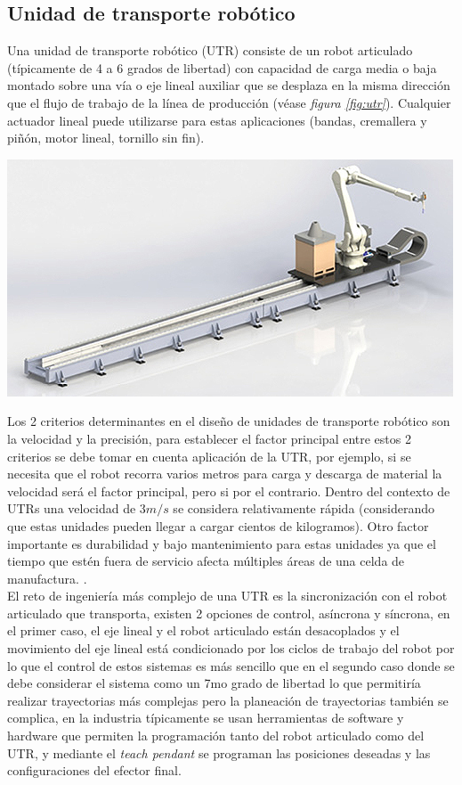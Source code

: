 \subsection{Unidad de transporte robótico}
Una unidad de transporte robótico (UTR) consiste de un robot articulado (típicamente de 4 a 6 grados de libertad) con capacidad de carga media o baja montado sobre una vía o eje lineal auxiliar que se desplaza en la misma dirección que el flujo de trabajo de la línea de producción (véase \emph{figura \ref{fig:utr}}). Cualquier actuador lineal puede utilizarse para estas aplicaciones (bandas, cremallera y piñón, motor lineal, tornillo sin fin).\\
\begin{center}
    \includegraphics[scale=0.55]{imagenes/Kawasaki-transport-unit-RTU.jpg}
    \label{fig:utr}
\end{center}
Los 2 criterios determinantes en el diseño de unidades de transporte robótico son la velocidad y la precisión, para establecer el factor principal entre estos 2 criterios se debe tomar en cuenta aplicación de la UTR, por ejemplo, si se necesita que el robot recorra varios metros para carga y descarga de material la velocidad será el factor principal, pero si por el contrario. Dentro del contexto de UTRs una velocidad de $3m/s$ se considera relativamente rápida (considerando que estas unidades pueden llegar a cargar cientos de kilogramos). Otro factor importante es durabilidad y bajo mantenimiento para estas unidades ya que el tiempo que estén fuera de servicio afecta múltiples áreas de una celda de manufactura. \cite{Referencia5}.\\
El reto de ingeniería más complejo de una UTR es la sincronización con el robot articulado que transporta, existen 2 opciones de control, asíncrona y síncrona, en el primer caso, el eje lineal y el robot articulado están desacoplados y el movimiento del eje lineal está condicionado por los ciclos de trabajo del robot por lo que el control de estos sistemas es más sencillo que en el segundo caso donde se debe considerar el sistema como un 7mo grado de libertad lo que permitiría realizar trayectorias más complejas pero la planeación de trayectorias también se complica, en la industria típicamente se usan herramientas de software y hardware que permiten la programación tanto del robot articulado como del UTR, y mediante el \emph{teach pendant} se programan las posiciones deseadas y las configuraciones del efector final.\\

